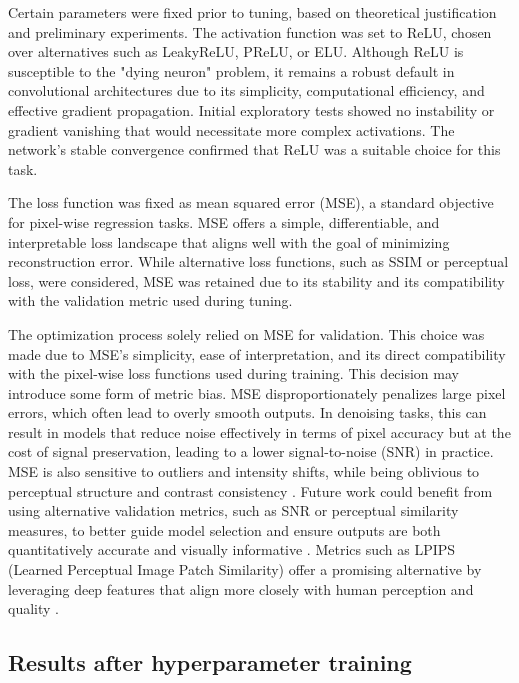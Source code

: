 \documentclass[twocolumn]{article}
\begin{document}
Certain parameters were fixed prior to tuning, based on theoretical justification and preliminary experiments. 
The activation function was set to ReLU, chosen over alternatives such as LeakyReLU, PReLU, or ELU. 
Although ReLU is susceptible to the "dying neuron" problem, it remains a robust default in convolutional architectures due to its simplicity, computational efficiency, and effective gradient propagation. 
Initial exploratory tests showed no instability or gradient vanishing that would necessitate more complex activations. 
The network’s stable convergence confirmed that ReLU was a suitable choice for this task.

The loss function was fixed as mean squared error (MSE), a standard objective for pixel-wise regression tasks. 
MSE offers a simple, differentiable, and interpretable loss landscape that aligns well with the goal of minimizing reconstruction error. 
While alternative loss functions, such as SSIM or perceptual loss, were considered, MSE was retained due to its stability and its compatibility with the validation metric used during tuning. 

The optimization process solely relied on MSE for validation. 
This choice was made due to MSE’s simplicity, ease of interpretation, and its direct compatibility with the pixel-wise loss functions used during training.  
This decision may introduce some form of metric bias. 
MSE disproportionately penalizes large pixel errors, which often lead to overly smooth outputs. 
In denoising tasks, this can result in models that reduce noise effectively in terms of pixel accuracy but at the cost of signal preservation, leading to a lower signal-to-noise (SNR) in practice. 
MSE is also sensitive to outliers and intensity shifts, while being oblivious to perceptual structure and contrast consistency \cite{1284395}. 
Future work could benefit from using alternative validation metrics, such as SNR or perceptual similarity measures, to better guide model selection and ensure outputs are both quantitatively accurate and visually informative \cite{chavhan2009t2star}. 
Metrics such as LPIPS (Learned Perceptual Image Patch Similarity) offer a promising alternative by leveraging deep features that align more closely with human perception and quality \cite{zhang2018unreasonableeffectivenessdeepfeatures}.

\subsection{Results after hyperparameter training}
\end{document}
